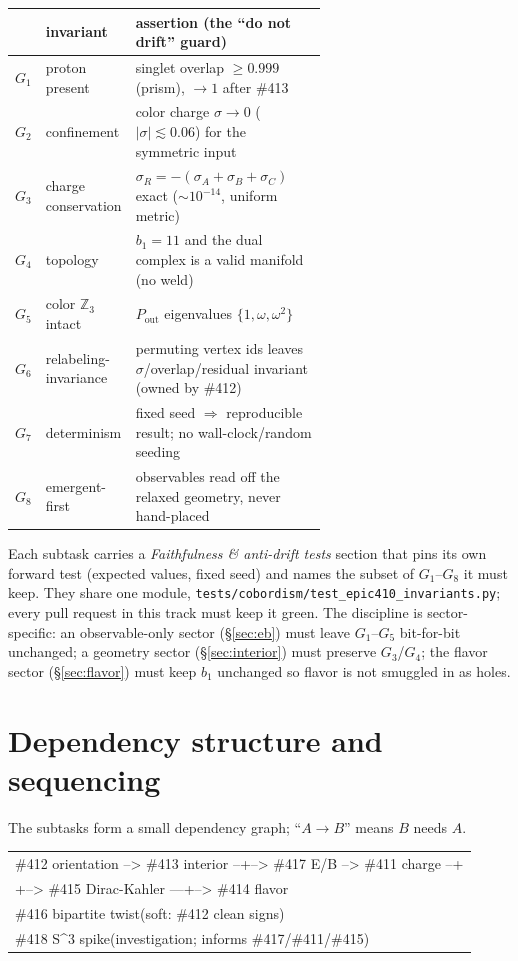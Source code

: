 \documentclass[11pt]{article}
\theoremstyle{definition}
\newcommand{\Z}{\mathbb{Z}}
\newcommand{\abs}[1]{\left\lvert #1 \right\rvert}
\newcommand{\sigmacol}{\sigma}
\newcommand{\Pout}{P_{\mathrm{out}}}
\begin{document}
\begin{center}
\small
\setlength{\tabcolsep}{5pt}
\begin{tabular}{@{}clp{0.62\linewidth}@{}}
\toprule
 & invariant & assertion (the ``do not drift'' guard)\\
\midrule
$G_1$ & proton present & singlet overlap $\ge 0.999$ (prism), $\to1$ after \#413\\
$G_2$ & confinement & color charge $\sigmacol\to0$ ($\abs{\sigmacol}\lesssim0.06$) for the symmetric input\\
$G_3$ & charge conservation & $\sigmacol_R=-(\sigmacol_A+\sigmacol_B+\sigmacol_C)$ exact ($\sim10^{-14}$, uniform metric)\\
$G_4$ & topology & $b_1=11$ and the dual complex is a valid manifold (no weld)\\
$G_5$ & color $\Z_3$ intact & $\Pout$ eigenvalues $\{1,\omega,\omega^2\}$\\
$G_6$ & relabeling-invariance & permuting vertex ids leaves $\sigmacol$/overlap/residual invariant (owned by \#412)\\
$G_7$ & determinism & fixed seed $\Rightarrow$ reproducible result; no wall-clock/random seeding\\
$G_8$ & emergent-first & observables read off the relaxed geometry, never hand-placed\\
\bottomrule
\end{tabular}
\end{center}

\noindent Each subtask carries a \emph{Faithfulness \& anti-drift tests} section that
pins its own forward test (expected values, fixed seed) and names the subset of
$G_1$--$G_8$ it must keep. They share one module,
\texttt{tests/cobordism/test\_epic410\_invariants.py}; every pull request in this track
must keep it green. The discipline is sector-specific: an observable-only sector
(\S\ref{sec:eb}) must leave $G_1$--$G_5$ bit-for-bit unchanged; a geometry sector
(\S\ref{sec:interior}) must preserve $G_3$/$G_4$; the flavor sector
(\S\ref{sec:flavor}) must keep $b_1$ unchanged so flavor is not smuggled in as holes.

\section{Dependency structure and sequencing}
\label{sec:deps}

The subtasks form a small dependency graph; ``$A\to B$'' means $B$ needs $A$.

\begin{center}
\ttfamily\small
\begin{tabular}{@{}l@{}}
\#412 orientation --> \#413 interior --+--> \#417 E/B --> \#411 charge --+\\
\hphantom{\#412 orientation --> \#413 interior } +--> \#415 Dirac-Kahler ---+--> \#414 flavor\\
\#416 bipartite twist\hphantom{xxxx}(soft: \#412 clean signs)\\
\#418 S\textasciicircum3 spike\hphantom{xxxxxxx}(investigation; informs \#417/\#411/\#415)\\
\end{tabular}
\end{center}
\end{document}
